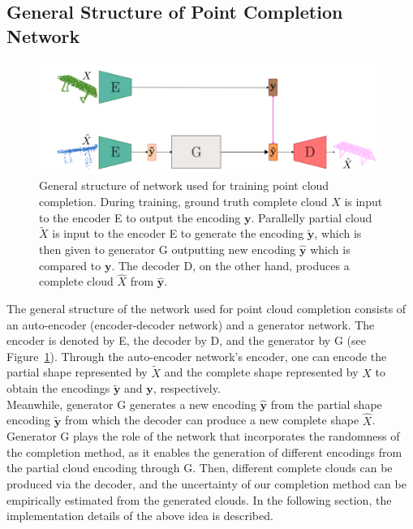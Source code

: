     \subsection{General Structure of Point Completion Network}
    \begin{figure}[htb]
      \begin{center}
      \includegraphics[width=\linewidth]{figures/general_network.png}
      \end{center}
      \caption{General structure of network used for training point cloud completion. During training, ground truth complete cloud $X$ is input to the encoder E to output the encoding $\mathbf{y}$. Parallelly partial cloud $\tilde{X}$ is input to the encoder E to generate the encoding $\mathbf{\tilde{y}}$, which is then given to generator G outputting new encoding $\mathbf{\hat{y}}$ which is compared to $\mathbf{y}$. The decoder D, on the other hand, produces a complete cloud $\hat{X}$ from  $\mathbf{\hat{y}}$.}\label{fig:gen_net}
    \end{figure}
    The general structure of the network used for point cloud completion consists of an auto-encoder (encoder-decoder network) and a generator network. The encoder is denoted by E, the decoder by D, and the generator by G (see Figure~\ref{fig:gen_net}). Through the auto-encoder network's encoder, one can encode the partial shape represented by $\tilde{X}$ and the complete shape represented by $X$ to obtain the encodings $\mathbf{\tilde{y}}$ and $\mathbf{y}$, respectively. 
    \\
    Meanwhile, generator G generates a new encoding $\mathbf{\hat{y}}$ from the partial shape encoding $\mathbf{\tilde{y}}$ from which the decoder can produce a new complete shape $\hat{X}$. Generator G plays the role of the network that incorporates the randomness of the completion method, as it enables the generation of different encodings from the partial cloud encoding through G. Then, different complete clouds can be produced via the decoder, and the uncertainty of our completion method can be empirically estimated from the generated clouds. In the following section, the implementation details of the above idea is described.

